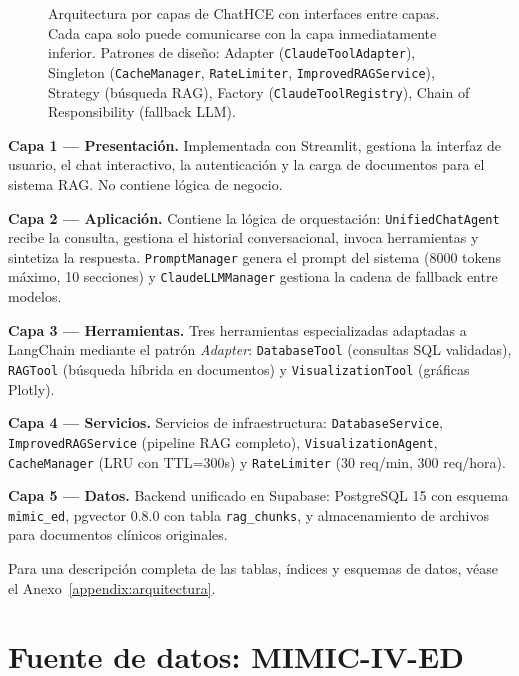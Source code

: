 \begin{figure}[p]
{\begin{tikzpicture}
\end{tikzpicture}%
}%
\caption{Arquitectura por capas de ChatHCE con interfaces entre capas. Cada capa solo puede comunicarse con la capa inmediatamente inferior. Patrones de diseño: Adapter (\texttt{ClaudeToolAdapter}), Singleton (\texttt{CacheManager}, \texttt{RateLimiter}, \texttt{ImprovedRAGService}), Strategy (búsqueda \acs{RAG}), Factory (\texttt{ClaudeToolRegistry}), Chain of Responsibility (fallback \acs{LLM}).}
\label{fig:capas_interfaces}
\end{figure}

\textbf{Capa 1 --- Presentación.} Implementada con Streamlit, gestiona la interfaz de usuario, el chat interactivo, la autenticación y la carga de documentos para el sistema \ac{RAG}. No contiene lógica de negocio.

\textbf{Capa 2 --- Aplicación.} Contiene la lógica de orquestación: \texttt{UnifiedChatAgent} recibe la consulta, gestiona el historial conversacional, invoca herramientas y sintetiza la respuesta. \texttt{PromptManager} genera el prompt del sistema (8000 tokens máximo, 10 secciones) y \texttt{ClaudeLLMManager} gestiona la cadena de fallback entre modelos.

\textbf{Capa 3 --- Herramientas.} Tres herramientas especializadas adaptadas a LangChain mediante el patrón \textit{Adapter}: \texttt{DatabaseTool} (consultas \ac{SQL} validadas), \texttt{RAGTool} (búsqueda híbrida en documentos) y \texttt{VisualizationTool} (gráficas Plotly).

\textbf{Capa 4 --- Servicios.} Servicios de infraestructura: \texttt{DatabaseService}, \texttt{ImprovedRAGService} (pipeline \ac{RAG} completo), \texttt{VisualizationAgent}, \texttt{CacheManager} (\ac{LRU} con \ac{TTL}=300s) y \texttt{RateLimiter} (30 req/min, 300 req/hora).

\textbf{Capa 5 --- Datos.} Backend unificado en Supabase: PostgreSQL 15 con esquema \texttt{mimic\_ed}, pgvector 0.8.0 con tabla \texttt{rag\_chunks}, y almacenamiento de archivos para documentos clínicos originales.

Para una descripción completa de las tablas, índices y esquemas de datos, véase el Anexo~\ref{appendix:arquitectura}.

\section{Fuente de datos: \acs{MIMIC}-IV-ED}
\label{sec:mimic}

